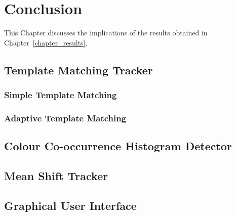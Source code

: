 \chapter{Conclusion}
This Chapter discusses the implications of the results obtained in
Chapter~\ref{chapter_results}. 

\section{Template Matching Tracker}



\subsection{Simple Template Matching}

\subsection{Adaptive Template Matching}


\section{Colour Co-occurrence Histogram Detector}

\section{Mean Shift Tracker}

\section{Graphical User Interface}

